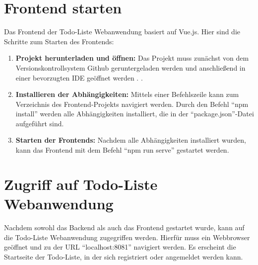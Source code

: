 \section{Frontend starten}
Das Frontend der Todo-Liste Webanwendung basiert auf Vue.js. Hier sind die Schritte zum Starten des Frontends:

\begin{enumerate}
	\item \textbf{Projekt herunterladen und öffnen:} Das Projekt muss zunächst von dem Versionskontrollsystem Github geruntergeladen werden und anschließend in einer bevorzugten IDE geöffnet werden \cite{noauthor_philippabeletdd--java_nodate}. .
	\item \textbf{Installieren der Abhängigkeiten:} Mittels einer Befehlszeile kann zum Verzeichnis des Frontend-Projekts navigiert werden. Durch den Befehl "`npm install"' werden alle Abhängigkeiten installiert, die in der "`package.json"'-Datei aufgeführt sind.
	\item \textbf{Starten der Frontends:} Nachdem alle Abhängigkeiten installiert wurden, kann das Frontend mit dem Befehl "`npm run serve"' gestartet werden.
\end{enumerate}
	
\section{Zugriff auf Todo-Liste Webanwendung}
Nachdem sowohl das Backend als auch das Frontend gestartet wurde, kann auf die Todo-Liste Webanwendung zugegriffen werden. Hierfür muss ein Webbrowser geöffnet und zu der URL "`localhost:8081"' navigiert werden. Es erscheint die Startseite der Todo-Liste, in der sich registriert oder angemeldet werden kann.

